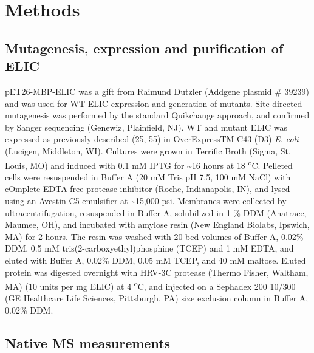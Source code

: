 \section{Methods}

\subsection{Mutagenesis, expression and purification of ELIC}

pET26-MBP-ELIC was a gift from Raimund Dutzler (Addgene plasmid \#
39239) and was used for WT ELIC expression and generation of mutants.
Site-directed mutagenesis was performed by the standard Quikchange
approach, and confirmed by Sanger sequencing (Genewiz, Plainfield, NJ).
WT and mutant ELIC was expressed as previously described (25, 55) in
OverExpressTM C43 (D3) \emph{E. coli} (Lucigen, Middleton, WI). Cultures
were grown in Terrific Broth (Sigma, St. Louis, MO) and induced with 0.1
mM IPTG for \textasciitilde{}16 hours at 18 \textsuperscript{o}C.
Pelleted cells were resuspended in Buffer A (20 mM Tris pH 7.5, 100 mM
NaCl) with cOmplete EDTA-free protease inhibitor (Roche, Indianapolis,
IN), and lysed using an Avestin C5 emulsifier at \textasciitilde{}15,000
psi. Membranes were collected by ultracentrifugation, resuspended in
Buffer A, solubilized in 1 \% DDM (Anatrace, Maumee, OH), and incubated
with amylose resin (New England Biolabs, Ipswich, MA) for 2 hours. The
resin was washed with 20 bed volumes of Buffer A, 0.02\% DDM, 0.5 mM
tris(2-carboxyethyl)phosphine (TCEP) and 1 mM EDTA, and eluted with
Buffer A, 0.02\% DDM, 0.05 mM TCEP, and 40 mM maltose. Eluted protein
was digested overnight with HRV-3C protease (Thermo Fisher, Waltham, MA)
(10 units per mg ELIC) at 4 \textsuperscript{o}C, and injected on a
Sephadex 200 10/300 (GE Healthcare Life Sciences, Pittsburgh, PA) size
exclusion column in Buffer A, 0.02\% DDM.

\subsection{Native MS measurements}

